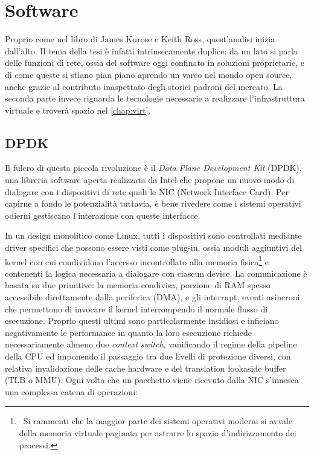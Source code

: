 \chapter{Software}
\label{chap:software}

Proprio come nel libro di James Kurose e Keith Ross, quest'analisi inizia dall'alto. Il tema della tesi è infatti intrinsecamente duplice: da un lato si parla delle funzioni di rete, ossia del software oggi confinato in soluzioni proprietarie, e di come queste si stiano pian piano aprendo un varco nel mondo open source, anche grazie al contributo inaspettato degli storici padroni del mercato. La seconda parte invece riguarda le tecnologie necessarie a realizzare l'infrastruttura virtuale e troverà spazio nel \cref{chap:virt}.

\section{DPDK}
\label{sec:dpdk}

Il fulcro di questa piccola rivoluzione è il \textit{Data Plane Development Kit} (DPDK), una libreria software aperta realizzata da Intel che propone un nuovo modo di dialogare con i dispositivi di rete quali le NIC (Network Interface Card). Per capirne a fondo le potenzialità tuttavia, è bene rivedere come i sistemi operativi odierni gestiscano l'interazione con queste interfacce.

In un design monolitico come Linux, tutti i dispositivi sono controllati mediante driver specifici che possono essere visti come plug-in, ossia moduli aggiuntivi del kernel con cui condividono l'accesso incontrollato alla memoria fisica\footnote{\ Si rammenti che la maggior parte dei sistemi operativi moderni si avvale della memoria virtuale paginata per astrarre lo spazio d'indirizzamento dei processi.} e contenenti la logica necessaria a dialogare con ciascun device. La comunicazione è basata su due primitive: la memoria condivisa, porzione di RAM spesso accessibile direttamente dalla periferica (DMA), e gli interrupt, eventi asincroni che permettono di invocare il kernel interrompendo il normale flusso di esecuzione. Proprio questi ultimi sono particolarmente insidiosi e inficiano negativamente le performance in quanto la loro esecuzione richiede necessariamente almeno due \textit{context switch}, vanificando il regime della pipeline della CPU ed imponendo il passaggio tra due livelli di protezione diversi, con relativa invalidazione delle cache hardware e del translation lookaside buffer (TLB o MMU). Ogni volta che un pacchetto viene ricevuto dalla NIC s'innesca una complessa catena di operazioni:

